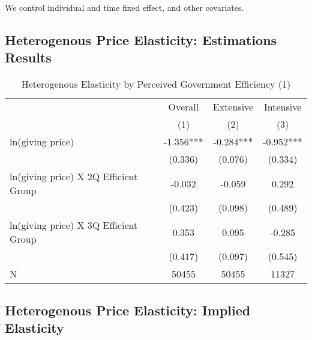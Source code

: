 \documentclass[ review  , 3p ]{elsarticle}
\begin{document}
  We control individual and time fixed effect,
  and other covariates.

  \hypertarget{heterogenous-price-elasticity-estimations-results}{%
  \subsection{Heterogenous Price Elasticity: Estimations Results}\label{heterogenous-price-elasticity-estimations-results}}

  \begin{table}

  \caption{\label{tab:kableHeteroElasticitySlide1}Heterogenous Elasticity by Perceived Government Efficiency (1)}
  \centering
  \fontsize{8}{10}\selectfont
  \begin{tabular}[t]{lccc}
  \toprule
  \multicolumn{1}{c}{ } & \multicolumn{1}{c}{Overall} & \multicolumn{1}{c}{Extensive} & \multicolumn{1}{c}{Intensive} \\
  \cmidrule(l{3pt}r{3pt}){2-2} \cmidrule(l{3pt}r{3pt}){3-3} \cmidrule(l{3pt}r{3pt}){4-4}
   & (1) & (2) & (3)\\
  \midrule
  ln(giving price) & -1.356*** & -0.284*** & -0.952***\\
   & (0.336) & (0.076) & (0.334)\\
  ln(giving price) X 2Q Efficient Group & -0.032 & -0.059 & 0.292\\
   & (0.423) & (0.098) & (0.489)\\
  ln(giving price) X 3Q Efficient Group & 0.353 & 0.095 & -0.285\\
   & (0.417) & (0.097) & (0.545)\\
  N & 50455 & 50455 & 11327\\
  \bottomrule
  \end{tabular}
  \end{table}

  \hypertarget{heterogenous-price-elasticity-implied-elasticity}{%
  \subsection{Heterogenous Price Elasticity: Implied Elasticity}\label{heterogenous-price-elasticity-implied-elasticity}}
\end{document}

